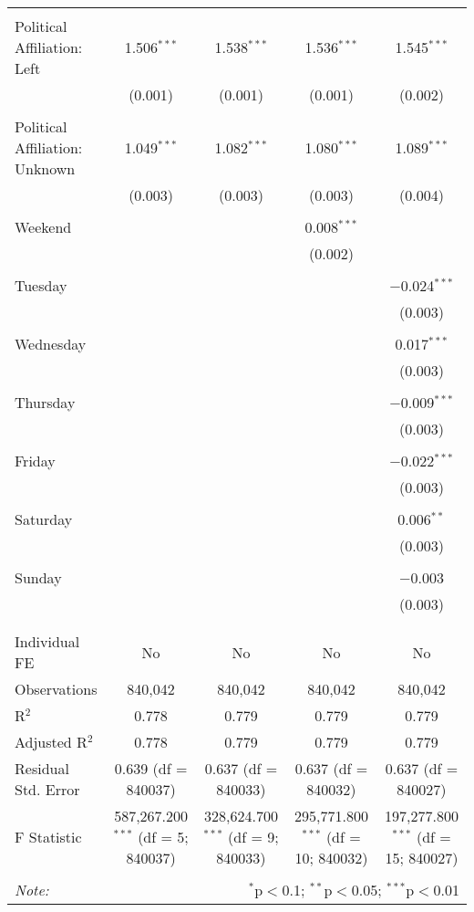 \documentclass[
]{article}
\begin{document}
\begin{table}[!htbp]
{\begin{tabular}{@{\extracolsep{5pt}}lcccc}
  & & & & \\ 
 Political Affiliation: Left & 1.506$^{***}$ & 1.538$^{***}$ & 1.536$^{***}$ & 1.545$^{***}$ \\ 
  & (0.001) & (0.001) & (0.001) & (0.002) \\ 
  & & & & \\ 
 Political Affiliation: Unknown & 1.049$^{***}$ & 1.082$^{***}$ & 1.080$^{***}$ & 1.089$^{***}$ \\ 
  & (0.003) & (0.003) & (0.003) & (0.004) \\ 
  & & & & \\ 
 Weekend &  &  & 0.008$^{***}$ &  \\ 
  &  &  & (0.002) &  \\ 
  & & & & \\ 
 Tuesday &  &  &  & $-$0.024$^{***}$ \\ 
  &  &  &  & (0.003) \\ 
  & & & & \\ 
 Wednesday &  &  &  & 0.017$^{***}$ \\ 
  &  &  &  & (0.003) \\ 
  & & & & \\ 
 Thursday &  &  &  & $-$0.009$^{***}$ \\ 
  &  &  &  & (0.003) \\ 
  & & & & \\ 
 Friday &  &  &  & $-$0.022$^{***}$ \\ 
  &  &  &  & (0.003) \\ 
  & & & & \\ 
 Saturday &  &  &  & 0.006$^{**}$ \\ 
  &  &  &  & (0.003) \\ 
  & & & & \\ 
 Sunday &  &  &  & $-$0.003 \\ 
  &  &  &  & (0.003) \\ 
  & & & & \\ 
\hline \\[-1.8ex] 
Individual FE & No & No & No & No \\ 
Observations & 840,042 & 840,042 & 840,042 & 840,042 \\ 
R$^{2}$ & 0.778 & 0.779 & 0.779 & 0.779 \\ 
Adjusted R$^{2}$ & 0.778 & 0.779 & 0.779 & 0.779 \\ 
Residual Std. Error & 0.639 (df = 840037) & 0.637 (df = 840033) & 0.637 (df = 840032) & 0.637 (df = 840027) \\ 
F Statistic & 587,267.200$^{***}$ (df = 5; 840037) & 328,624.700$^{***}$ (df = 9; 840033) & 295,771.800$^{***}$ (df = 10; 840032) & 197,277.800$^{***}$ (df = 15; 840027) \\ 
\hline 
\hline \\[-1.8ex] 
\textit{Note:}  & \multicolumn{4}{r}{$^{*}$p$<$0.1; $^{**}$p$<$0.05; $^{***}$p$<$0.01} \\ 
\end{tabular}
} 
\end{table} 
\newpage
\end{document}
